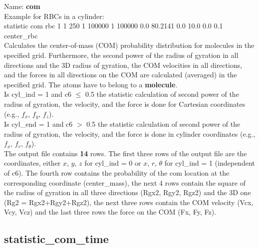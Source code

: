 \documentclass[a4paper,10pt]{scrreprt}
\begin{document}
Name: {\bfseries com}\\[2ex]
Example for RBCs in a cylinder:\\[0.5ex]
statistic       com rbc 1 1 250 1 100000 1 100000 0.0 80.2141 0.0 10.0 0.0 0.1 center\_rbc
\\[2ex]
Calculates the center-of-mass (COM) probability distribution for molecules in the specified grid.
Furthermore, the second power of the radius of gyration in all directions and the 3D radius of gyration, the COM velocities in all directions, and the forces in all directions on the COM are calculated (averaged) in the specified grid.
The atoms have to belong to a \textbf{molecule}.
\\[2ex]
Is cyl\_ind = 1 and c6 $\le$ 0.5 the statistic calculation of second power of the radius of gyration, the velocity, and the force is done for Cartesian coordinates (e.g., $f_x$, $f_y$, $f_z$).\\
Is cyl\_end = 1 and c6 $>$ 0.5 the statistic calculation of second power of the radius of gyration, the velocity, and the force is done in cylinder coordinates (e.g., $f_x$, $f_r$, $f_{\theta}$).
\\[2ex]
The output file contains {\bfseries 14} rows.
The first three rows of the output file are the coordinates, either $x$, $y$, $z$ for cyl\_ind = 0 or $x$, $r$, $\theta$ for cyl\_ind = 1 (independent of c6).
The fourth row contains the probability of the com location at the corresponding coordinate (center\_mass), the next 4 rows contain the square of the radius of gyration in all three directions (Rgx2, Rgy2, Rgz2) and the 3D one (Rg2 = Rgx2+Rgy2+Rgz2), the next three rows contain the COM velocity (Vcx, Vcy, Vcz) and the last three rows the force on the COM (Fx, Fy, Fz).


\subsection{statistic\_com\_time}
\end{document}
